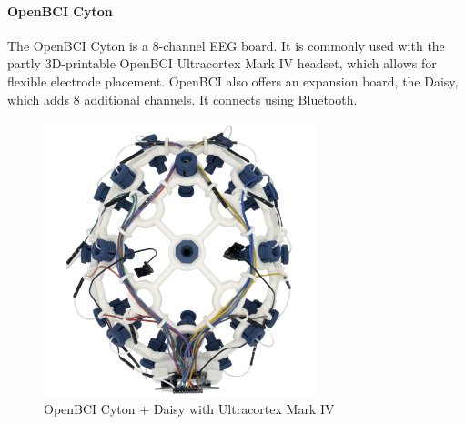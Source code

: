     \begin{minipage}{\textwidth}
        \paragraph*{OpenBCI Cyton}
        The OpenBCI Cyton is a 8-channel EEG board. It is commonly used with the partly 3D-printable OpenBCI Ultracortex Mark IV headset, which allows for flexible electrode placement. OpenBCI also offers an expansion board, the Daisy, which adds 8 additional channels. It connects using Bluetooth.


        \begin{figure}[H]
            \centering
            \includegraphics[width=80mm]{img/openbci-cyton.jpg}
            \caption{OpenBCI Cyton + Daisy with Ultracortex Mark IV}\label{fig:cyton}
        \end{figure}
    \end{minipage}

    \vspace{1cm}

